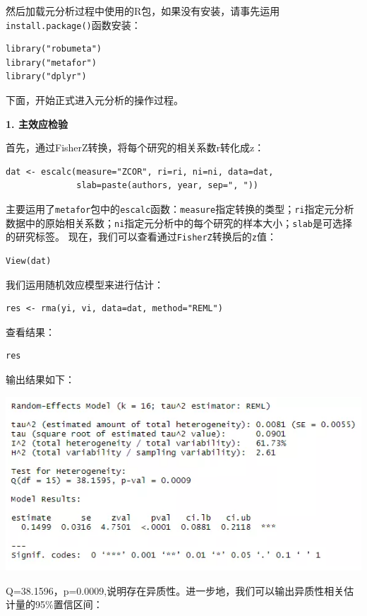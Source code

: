 \documentclass[
]{book}
\begin{document}
然后加载元分析过程中使用的R包，如果没有安装，请事先运用\texttt{install.package()}函数安装：

\begin{verbatim}
library("robumeta")
library("metafor")
library("dplyr")
\end{verbatim}

下面，开始正式进入元分析的操作过程。

\textbf{1. 主效应检验}

首先，通过FisherZ转换，将每个研究的相关系数r转化成z：

\begin{verbatim}
dat <- escalc(measure="ZCOR", ri=ri, ni=ni, data=dat, 
              slab=paste(authors, year, sep=", ")) 
\end{verbatim}

主要运用了\texttt{metafor}包中的\texttt{escalc}函数：\texttt{measure}指定转换的类型；\texttt{ri}指定元分析数据中的原始相关系数；\texttt{ni}指定元分析中的每个研究的样本大小；\texttt{slab}是可选择的研究标签。
现在，我们可以查看通过\texttt{FisherZ}转换后的\texttt{z}值：

\begin{verbatim}
View(dat)
\end{verbatim}

我们运用随机效应模型来进行估计：

\begin{verbatim}
res <- rma(yi, vi, data=dat, method="REML") 
\end{verbatim}

查看结果：

\begin{verbatim}
res
\end{verbatim}

输出结果如下：

\includegraphics{figs/3211.png}

Q=38.1596，p=0.0009,说明存在异质性。进一步地，我们可以输出异质性相关估计量的95\%置信区间：
\end{document}
